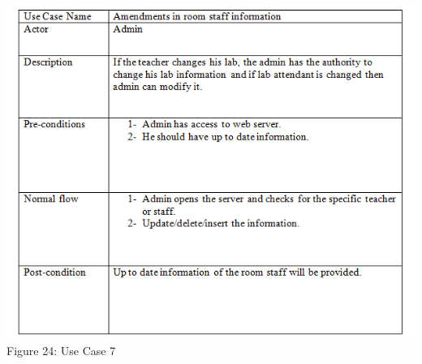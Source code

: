 \documentclass{article}
\begin{document}
\begin{center}
\includegraphics[scale=0.75]{uc7}
\\Figure 24: Use Case 7
\end{center}
\end{document}
